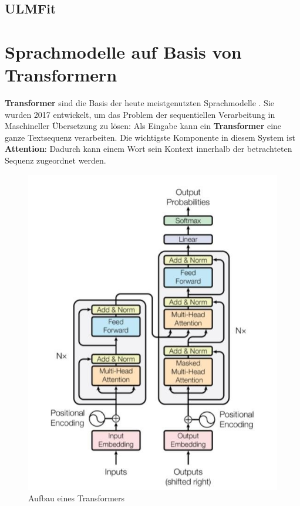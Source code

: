 \subsection{ULMFit}

\section{Sprachmodelle auf Basis von Transformern}
\textbf{Transformer} sind die Basis der heute meistgenutzten Sprachmodelle \cite{bert}\cite{gpt}. Sie wurden 2017 entwickelt, um das Problem der sequentiellen Verarbeitung in Maschineller \"Ubersetzung zu l\"osen: Als Eingabe kann ein \textbf{Transformer} eine ganze Textsequenz verarbeiten. Die wichtigste Komponente in diesem System ist \textbf{Attention}: Dadurch kann einem Wort sein Kontext innerhalb der betrachteten Sequenz zugeordnet werden.\\
\begin{figure}[!ht]
\centering
\includegraphics{pics/attention.jpg}
\caption{Aufbau eines Transformers \cite{attention}}
\label{fig:attention}
\end{figure}

